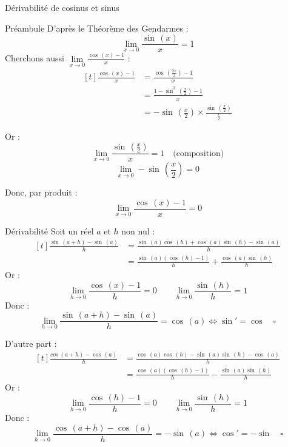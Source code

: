 \documentclass{coursbook}
\begin{document}
\begin{Gpartie}{Dérivabilité de cosinus et sinus}
\begin{Spartie}{Préambule}
            D'après le Théorème des Gendarmes : \[\lim\limits_{x\to0}\frac{\sin\,(x)}{x}=1\]
            \vspace{2ex}
            Cherchons aussi \quad $\lim\limits_{x\to0}\frac{\cos\,(x)-1}{x}$ : 
            \[\begin{aligned}[t]
                \frac{\cos\,(x)-1}{x} &= \frac{\cos\,\left(\frac{2x}{2}\right)-1}{x} \\
                &= \frac{1-\sin^2\,\left(\frac{x}{2}\right)-1}{x} \\
                &= -\sin\,\left(\frac{x}{2}\right)\times\frac{\sin\,\left(\frac{x}{2}\right)}{\frac{x}{2}}
            \end{aligned}\]
            
            Or :  \[\lim\limits_{x\to0}\dfrac{\sin\,\left(\frac{x}{2}\right)}{x}=1\quad\text{(composition)}\] \[\lim\limits_{x\to0}-\sin\,\left(\frac{x}{2}\right)=0\]

            Donc, par produit : \[\lim\limits_{x\to0}\dfrac{\cos\,(x)-1}{x}=0\]
        \end{Spartie}
        \begin{Spartie}{Dérivabilité} 
            Soit un réel $a$ et $h$ non nul : 
            \[\begin{aligned}[t]
                \frac{\sin\,(a+h)-\sin\,(a)}{h} &= \frac{\sin\,(a)\cos\,(h)+\cos\,(a)\sin\,(h)-\sin\,(a)}{h} \\
                &= \frac{\sin\,(a)\left(\cos\,(h)-1\right)}{h}+\frac{\cos\,(a)\sin\,(h)}{h}
            \end{aligned}\]
            Or : \[\lim\limits_{h\to0}\frac{\cos\,(x)-1}{h}=0\qquad\lim\limits_{h\to0}\frac{\sin\,(h)}{h}=1\]
            Donc : \[\lim\limits_{h\to0}\frac{\sin\,(a+h)-\sin\,(a)}{h}=\cos\,(a)\iff\sin'=\cos\quad\square\]

            D'autre part : 
            \[\begin{aligned}[t]
                \frac{cos\,(a+h)-\cos\,(a)}{h} &= \frac{\cos\,(a)\cos\,(h)-\sin\,(a)\sin\,(h)-\cos\,(a)}{h} \\
                &= \frac{\cos\,(a)(\cos\,(h)-1)}{h}-\frac{\sin\,(a)\sin\,(h)}{h}
            \end{aligned}\]
            Or : \[\lim\limits_{h\to0}\frac{\cos\,(h)-1}{h}=0\qquad\lim\limits_{h\to0}\frac{\sin\,(h)}{h}=1\]
            Donc : \[\lim\limits_{h\to0}\frac{\cos\,(a+h)-\cos\,(a)}{h}=-\sin\,(a)\iff\cos'=-\sin\quad\square\]

        \end{Spartie}
    \end{Gpartie}
	
\end{document}

